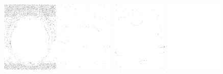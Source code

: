 \begin{figure}[h]
\center
\includegraphics[width=0.24\textwidth]{images/swi/03a_residue.png}
\includegraphics[width=0.24\textwidth]{images/swi/03b_irrotational.png}
\includegraphics[width=0.24\textwidth]{images/swi/03c_rotational.png}
\includegraphics[width=0.24\textwidth]{images/swi/03d_quality.png}

\label{fig:Exploring_SWI_Data}
\end{figure}


